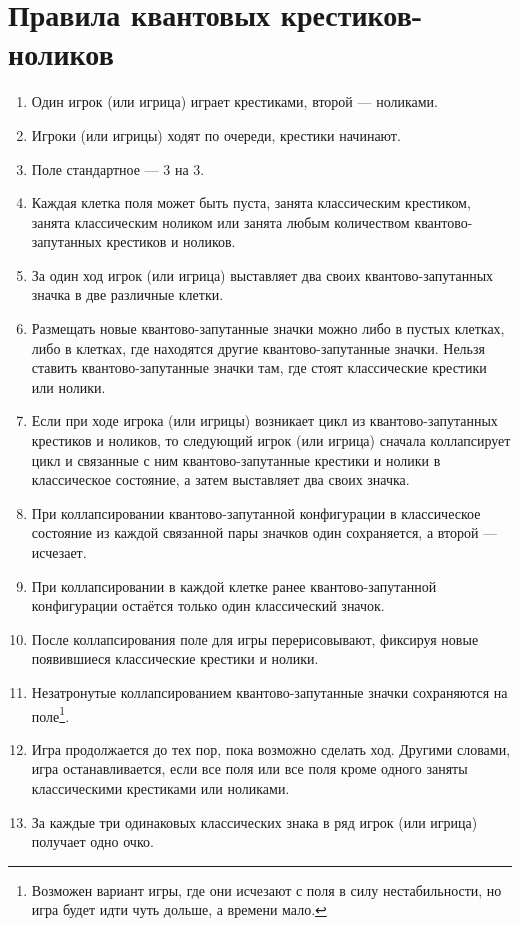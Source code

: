 \documentclass[11pt]{article} %
\begin{document}
\section*{Правила квантовых крестиков-ноликов}
\begin{enumerate}
    \item Один игрок (или игрица) играет крестиками, второй — ноликами. 
    \item Игроки (или игрицы) ходят по очереди, крестики начинают. 
    \item Поле стандартное — 3 на 3. 
    \item Каждая клетка поля может быть пуста, занята классическим крестиком, занята классическим ноликом или занята любым количеством квантово-запутанных крестиков и ноликов. 
    \item За один ход игрок (или игрица) выставляет два своих квантово-запутанных значка в две различные клетки. 
    \item Размещать новые квантово-запутанные значки можно либо в пустых клетках, либо в клетках, где находятся другие квантово-запутанные значки.
    Нельзя ставить квантово-запутанные значки там, где стоят классические крестики или нолики. 
    \item Если при ходе игрока (или игрицы) возникает цикл из квантово-запутанных крестиков и ноликов, 
    то следующий игрок (или игрица) сначала коллапсирует цикл и связанные с ним квантово-запутанные крестики и нолики в классическое состояние, а 
    затем выставляет два своих значка.
    \item При коллапсировании квантово-запутанной конфигурации в классическое состояние из каждой связанной пары значков один сохраняется, а второй — исчезает.
    \item При коллапсировании в каждой клетке ранее квантово-запутанной конфигурации остаётся только один классический значок. 
    \item После коллапсирования поле для игры перерисовывают, фиксируя новые появившиеся классические крестики и нолики. 
    \item Незатронутые коллапсированием квантово-запутанные значки сохраняются на поле\footnote{Возможен вариант игры, 
    где они исчезают с поля в силу нестабильности, но игра будет идти чуть дольше, а времени мало.}. 
    \item Игра продолжается до тех пор, пока возможно сделать ход. 
    Другими словами, игра останавливается, если все поля или все поля кроме одного заняты классическими крестиками или ноликами.
    \item За каждые три одинаковых классических знака в ряд игрок (или игрица) получает одно очко. 
\end{enumerate}
\end{document}
